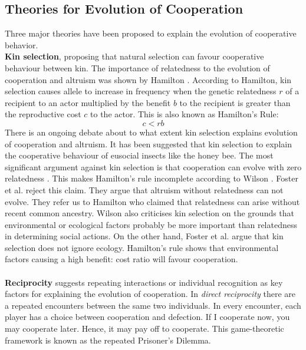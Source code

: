 \documentclass{article}
\begin{document}
\subsection*{Theories for Evolution of Cooperation}
Three major theories have been proposed to explain the evolution of cooperative behavior.
\\\textbf{Kin selection}, proposing that natural selection can favour cooperative behaviour between kin. The importance of relatedness to the evolution of cooperation and altruism was shown by Hamilton \cite{hamilton1964genetical}. According to Hamilton, kin selection causes allele to increase in frequency when the genetic relatedness $r$ of a recipient to an actor multiplied by the benefit $b$ to the recipient is greater than the reproductive cost $c$ to the actor. This is also known as Hamilton's Rule:
\begin{equation} \label{hamiltonrule}
c<rb
\end{equation}
There is an ongoing debate about to what extent kin selection explains evolution of cooperation and altruism.
It has been suggested that kin selection to explain the cooperative behaviour of eusocial insects like the honey bee.
The most significant argument against kin selection is that cooperation can evolve with zero relatedness \cite{wilson2005kin}. This makes Hamilton's rule incomplete according to Wilson \cite{wilson2005kin}. Foster et al. \cite{foster2006kin} reject this claim. They argue that altruism without relatedness can not evolve. They refer us to Hamilton who claimed that relatedness can arise without recent common ancestry. 
Wilson also criticises kin selection on the grounds that environmental or ecological factors probably be more important than relatedness in determining social actions. On the other hand, Foster et al. \cite{foster2006kin} argue that kin selection does not ignore ecology. Hamilton’s rule shows
that environmental factors causing a high benefit: cost ratio will favour cooperation. \\\\\textbf{Reciprocity} suggests repeating interactions or individual recognition as key factors for explaining the evolution of cooperation. In \textit{direct reciprocity} there are a repeated encounters between the same two individuals. In every encounter, each player has a choice between cooperation and defection. If I cooperate now, you may cooperate later. Hence, it may pay off to cooperate.
This game-theoretic framework is known as the repeated Prisoner's Dilemma. 
\end{document}

